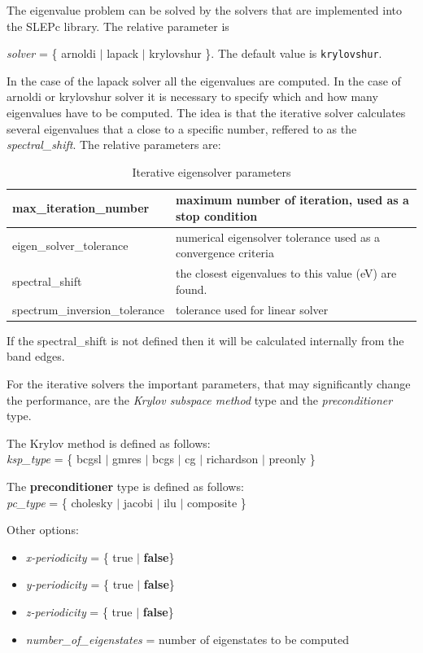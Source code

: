 The eigenvalue problem can be solved  by the solvers that are implemented into the SLEPc library.
The relative parameter is

\textit{solver} = \{ arnoldi $\vert$ lapack $\vert$ krylovshur \}. The default value is \texttt{krylovshur}.

In the case of the lapack solver all the eigenvalues are computed. In the case of arnoldi or krylovshur solver it is necessary to specify which and how many eigenvalues have to be computed. The idea is that the iterative solver calculates several eigenvalues that a close to a specific number, reffered to as the {\textit{spectral\_shift}}. 
The relative parameters are:
\begin{table}[htbp]
	\begin{tabular}{l|l}
	\hline
	max\_iteration\_number & maximum number of iteration, used as a stop condition   \\
	\hline
	eigen\_solver\_tolerance & numerical eigensolver tolerance used as a convergence criteria \\
	\hline
	spectral\_shift &  the closest eigenvalues to this value (eV) are found. \\
	\hline 
	spectrum\_inversion\_tolerance & tolerance used for linear solver  \\
	\hline
	\end{tabular}	
	\caption{Iterative eigensolver parameters}
	\label{tab:EigenParam}
\end{table}

If the spectral\_shift is not defined then it will be calculated internally from the band edges.

For the iterative solvers the important parameters, that may significantly change the performance, are the \textit{Krylov subspace method} type and the \textit{preconditioner} type. 

The Krylov method is defined as follows:\\
\textit{ksp\_type} = \{  bcgsl $\vert$ gmres  $\vert$ bcgs  $\vert$ cg  
$\vert$ richardson $\vert$ preonly  \}

The \textbf{preconditioner} type is defined as follows:\\
\textit{pc\_type} = \{  cholesky $\vert$  jacobi $\vert$  ilu  $\vert$ composite \}


Other options:
\begin{itemize}
\item 
\textit{x-periodicity} = \{ true $\vert$ \textbf{false}\} 
\item 
\textit{y-periodicity} = \{ true $\vert$ \textbf{false}\} 
\item 
\textit{z-periodicity} = \{ true $\vert$ \textbf{false}\}
\item 
\textit{number\_of\_eigenstates} =  number of eigenstates to be computed
\end{itemize}

